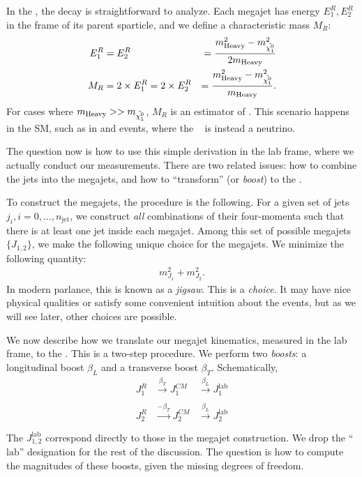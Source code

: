 In the \rframe, the decay is straightforward to analyze.
Each megajet has energy $E_1^R, E_2^R$ in the frame of its parent sparticle, and we define a characteristic mass $M_R$:
\begin{align}\label{eq:mr}
E_1^R &= E_2^R &= \frac{m_{\mathrm{Heavy}}^2 - m_{\tilde{\chi^0_1}}^2}{ 2 m_{\mathrm{Heavy}} } \\
M_R &= 2 \times E_1^R = 2 \times E_2^R &= \frac{m_{\mathrm{Heavy}}^2 - m_{\tilde{\chi^0_1}}^2}{m_{\mathrm{Heavy}} }.
\end{align}
For cases where $m_{\mathrm{Heavy}} >> m_{\tilde{\chi^0_1}}$, $M_R$ is an estimator of \mheavy.
This scenario happens in the SM, such as in \ttbar and \WW events, where the \lsp~ is instead a neutrino.

The question now is how to use this simple derivation in the lab frame, where we actually conduct our measurements.
There are two related issues: how to combine the jets into the megajets, and how to ``transform'' (or \textit{boost}) to the \rframe.

To construct the megajets, the procedure is the following.
For a given set of jets $j_i, i = 0 , ... , n_{\mathrm{jet}}$, we construct \textit{all} combinations of their four-momenta such that there is at least one jet inside each megajet.
Among this set of possible megajets $\{J_{1,2}\}$, we make the following unique choice for the megajets.
We minimize the following quantity:
\begin{align}
m_{J_1}^2 + m_{J_2}^2.
\end{align}
In modern parlance, this is known as a \textit{jigsaw}.
This is a \textit{choice}.
It may have nice physical qualities or satisfy some convenient intuition about the events, but as we will see later, other choices are possible.

We now describe how we translate our megajet kinematics, measured in the lab frame, to the \rframe.
This is a two-step procedure.
We perform two \textit{boosts}: a longitudinal boost $\beta_L$ and a transverse boost $\beta_T$.
Schematically,
\begin{align}
J_1^R & \xrightarrow[]{\beta_T } J_1^{CM} & \xrightarrow[]{\beta_L} J_1^{\text{lab}} \\
J_2^R & \xrightarrow[]{-\beta_T} J_2^{CM} & \xrightarrow[]{\beta_L} J_2^{\text{lab}} \\
\end{align}
The $J_{1,2}^{\text{lab}}$ correspond directly to those in the megajet construction.
We drop the ``$\text{lab}$'' designation for the rest of the discussion.
The question is how to compute the magnitudes of these boosts, given the missing degrees of freedom.

